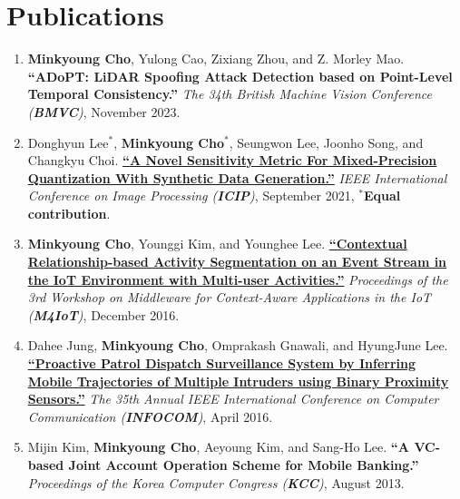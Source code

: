 \documentclass[letterpaper,oneside,11pt]{article}
\begin{document}
\section{Publications}
\begin{enumerate}[leftmargin=*, itemsep=0em]
  \item \small \textbf{Minkyoung Cho}, Yulong Cao, Zixiang Zhou, and Z. Morley Mao.  \textbf{``ADoPT: LiDAR Spoofing Attack Detection based on Point-Level Temporal Consistency.''} \textit{The 34th British Machine Vision Conference (\textbf{BMVC})}, November 2023.
  \item \small Donghyun Lee$^\ast$, \textbf{Minkyoung Cho$^\ast$}, Seungwon Lee, Joonho Song, and Changkyu Choi.  \textbf{\href{https://ieeexplore.ieee.org/abstract/document/9506527}{``A Novel Sensitivity Metric For Mixed-Precision Quantization With Synthetic Data Generation.''}} \textit{IEEE International Conference on Image Processing (\textbf{ICIP})}, September 2021, $^\ast$\textbf{Equal contribution}.
  \item \small \textbf{Minkyoung Cho}, Younggi Kim, and Younghee Lee. \textbf{\href{https://dl.acm.org/doi/10.1145/3008631.3008633}{``Contextual Relationship-based Activity Segmentation on an Event Stream in the IoT Environment with Multi-user Activities.''}} \textit{Proceedings of the 3rd Workshop on Middleware for Context-Aware Applications in the IoT (\textbf{M4IoT})}, December 2016.
  \item \small Dahee Jung, \textbf{Minkyoung Cho}, Omprakash Gnawali, and HyungJune Lee. \textbf{\href{https://ieeexplore.ieee.org/abstract/document/7524369}{``Proactive Patrol Dispatch Surveillance System by Inferring Mobile Trajectories of Multiple Intruders using Binary Proximity Sensors.''}} \textit{The 35th Annual IEEE International Conference on Computer Communication (\textbf{INFOCOM})}, April 2016.
  \item \small Mijin Kim, \textbf{Minkyoung Cho}, Aeyoung Kim, and Sang-Ho Lee. \textbf{``A VC-based Joint Account Operation Scheme for Mobile Banking.''} \textit{Proceedings of the Korea Computer Congress (\textbf{KCC})}, August 2013.
\end{enumerate}

\end{document}
